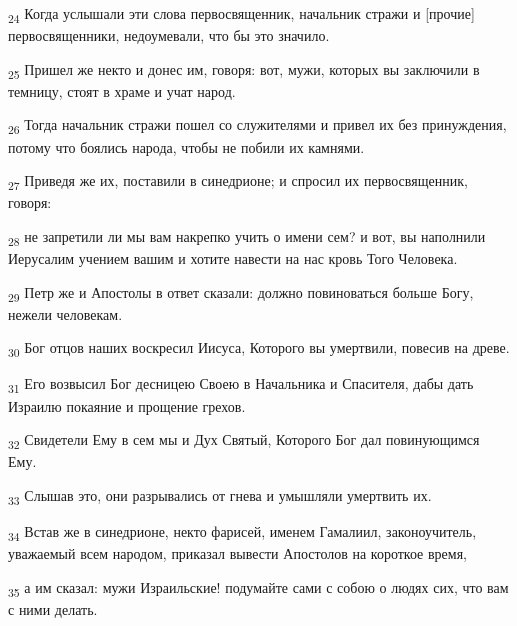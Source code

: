 \begin{tcolorbox}
\textsubscript{24} Когда услышали эти слова первосвященник, начальник стражи и [прочие] первосвященники, недоумевали, что бы это значило.
\end{tcolorbox}
\begin{tcolorbox}
\textsubscript{25} Пришел же некто и донес им, говоря: вот, мужи, которых вы заключили в темницу, стоят в храме и учат народ.
\end{tcolorbox}
\begin{tcolorbox}
\textsubscript{26} Тогда начальник стражи пошел со служителями и привел их без принуждения, потому что боялись народа, чтобы не побили их камнями.
\end{tcolorbox}
\begin{tcolorbox}
\textsubscript{27} Приведя же их, поставили в синедрионе; и спросил их первосвященник, говоря:
\end{tcolorbox}
\begin{tcolorbox}
\textsubscript{28} не запретили ли мы вам накрепко учить о имени сем? и вот, вы наполнили Иерусалим учением вашим и хотите навести на нас кровь Того Человека.
\end{tcolorbox}
\begin{tcolorbox}
\textsubscript{29} Петр же и Апостолы в ответ сказали: должно повиноваться больше Богу, нежели человекам.
\end{tcolorbox}
\begin{tcolorbox}
\textsubscript{30} Бог отцов наших воскресил Иисуса, Которого вы умертвили, повесив на древе.
\end{tcolorbox}
\begin{tcolorbox}
\textsubscript{31} Его возвысил Бог десницею Своею в Начальника и Спасителя, дабы дать Израилю покаяние и прощение грехов.
\end{tcolorbox}
\begin{tcolorbox}
\textsubscript{32} Свидетели Ему в сем мы и Дух Святый, Которого Бог дал повинующимся Ему.
\end{tcolorbox}
\begin{tcolorbox}
\textsubscript{33} Слышав это, они разрывались от гнева и умышляли умертвить их.
\end{tcolorbox}
\begin{tcolorbox}
\textsubscript{34} Встав же в синедрионе, некто фарисей, именем Гамалиил, законоучитель, уважаемый всем народом, приказал вывести Апостолов на короткое время,
\end{tcolorbox}
\begin{tcolorbox}
\textsubscript{35} а им сказал: мужи Израильские! подумайте сами с собою о людях сих, что вам с ними делать.
\end{tcolorbox}
